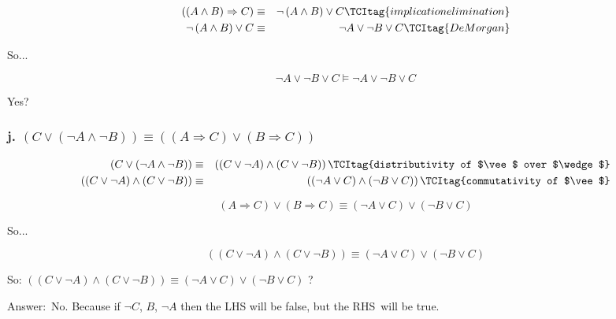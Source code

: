 \documentclass{article}
\begin{document}
\begin{eqnarray}
\left( \left( A\wedge B\right) \Rightarrow C\right) &\equiv &\lnot \left(
A\wedge B\right) \vee C  \TCItag{implication elimination} \\
\lnot \left( A\wedge B\right) \vee C &\equiv &\lnot A\vee \lnot B\vee C 
\TCItag{De Morgan}
\end{eqnarray}

So...

\[
\lnot A\vee \lnot B\vee C\models \lnot A\vee \lnot B\vee C 
\]

Yes?

\subsubsection{j. $\left( C\vee \left( \lnot A\wedge \lnot B\right) \right)
\equiv \left( \left( A\Rightarrow C\right) \vee \left( B\Rightarrow C\right)
\right) $}

\begin{eqnarray}
\left( C\vee \left( \lnot A\wedge \lnot B\right) \right)  &\equiv &\left(
\left( C\vee \lnot A\right) \wedge \left( C\vee \lnot B\right) \right)  
\TCItag{distributivity of $\vee $ over $\wedge $} \\
\left( \left( C\vee \lnot A\right) \wedge \left( C\vee \lnot B\right)
\right)  &\equiv &\left( \left( \lnot A\vee C\right) \wedge \left( \lnot
B\vee C\right) \right)   \TCItag{commutativity of $\vee $}
\end{eqnarray}

\begin{equation}
\left( A\Rightarrow C\right) \vee \left( B\Rightarrow C\right) \equiv \left(
\lnot A\vee C\right) \vee \left( \lnot B\vee C\right)   \tag{implication
elimination}
\end{equation}

So...

\[
\left( \left( C\vee \lnot A\right) \wedge \left( C\vee \lnot B\right)
\right) \equiv \left( \lnot A\vee C\right) \vee \left( \lnot B\vee C\right) 
\]

So: $\left( \left( C\vee \lnot A\right) \wedge \left( C\vee \lnot B\right)
\right) \equiv \left( \lnot A\vee C\right) \vee \left( \lnot B\vee C\right) $
?

Answer:\ No. Because if $\lnot C$, $B$, $\lnot A$ then the LHS will be
false, but the RHS\ will be true.
\end{document}

